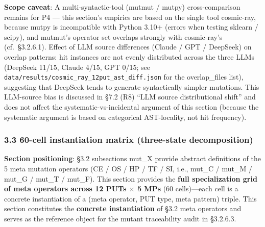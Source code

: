 \documentclass[review,12pt,authoryear]{elsarticle}
\begin{document}
\textbf{Scope caveat}: A multi-syntactic-tool (mutmut / mutpy)
cross-comparison remains for P4 --- this section's empirics are based on
the single tool cosmic-ray, because mutpy is incompatible with Python
3.10+ (errors when testing sklearn / scipy), and mutmut's operator set
overlaps strongly with cosmic-ray's (cf.~§3.2.6.1). Effect of LLM source
differences (Claude / GPT / DeepSeek) on overlap patterns: hit instances
are not evenly distributed across the three LLMs (DeepSeek 11/15, Claude
4/15, GPT 0/15; see
\texttt{data/results/cosmic\_ray\_12put\_ast\_diff.json} for the
overlap\_files list), suggesting that DeepSeek tends to generate
syntactically simpler mutations. This LLM-source bias is discussed in
§7.2 (R8) ``LLM source distributional shift'' and does not affect the
systematic-vs-incidental argument of this section (because the
systematic argument is based on categorical AST-locality, not hit
frequency).

\subsubsection{3.3 60-cell instantiation matrix (three-state
decomposition)}\label{cell-instantiation-matrix-three-state-decomposition}

\textbf{Section positioning}: §3.2 subsections mut\_X provide abstract
definitions of the 5 meta mutation operators (CE / OS / HP / TF / SI,
i.e., mut\_C / mut\_M / mut\_G / mut\_T / mut\_F). This section provides
the \textbf{full specialization grid of meta operators across 12 PUTs $\times$
5 MPs} (60 cells)---each cell is a concrete instantiation of a (meta
operator, PUT type, meta pattern) triple. This section constitutes the
\textbf{concrete instantiation} of §3.2 meta operators and serves as the
reference object for the mutant traceability audit in §3.2.6.3.
\end{document}
